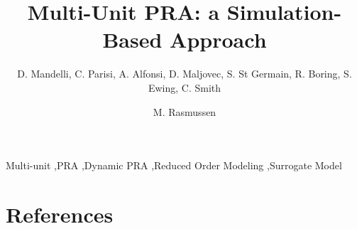 \documentclass{elsarticle}
\begin{document}
\begin{frontmatter}

\title{Multi-Unit PRA: a Simulation-Based Approach}

\author{D. Mandelli, C. Parisi, A. Alfonsi, D. Maljovec, S. St Germain, R. Boring, S. Ewing, C. Smith}
\address{Idaho National Laboratory (INL), 2525 Fremont Ave, 83402 Idaho Falls (ID), USA}

\author{M. Rasmussen}
\address{Norwegian University of Science and Technology (NTNU)}

\begin{abstract}
  
\end{abstract}

\begin{keyword}
Multi-unit \sep PRA \sep Dynamic PRA \sep Reduced Order Modeling \sep Surrogate Model
\end{keyword}

\end{frontmatter}

\linenumbers

\printnomenclature[1in]














\section*{References}


\end{document}
